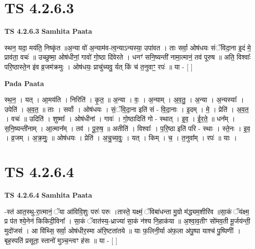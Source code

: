 \documentclass[17pt]{extarticle}
\begin{document}
\section*{ TS 4.2.6.3 }

\textbf{TS 4.2.6.3 } \newline
\textbf{Samhita Paata} \newline

स्थन॒ यदा॒ मय॑ति॒ निष्कृ॑त ॥अ॒न्या वो॑ अ॒न्याम॑व-त्व॒न्याऽन्यस्या॒ उपा॑वत । ताः सर्वा॒ ओष॑धयः संॅविदा॒ना इ॒दं मे॒ प्राव॑ता॒ वचः॑ ॥ उच्छुष्मा॒ ओष॑धीनां॒ गावो॑ गो॒ष्ठा दि॑वेरते । धनꣳ॑ सनि॒ष्यन्ती॑ नामा॒त्मानं॒ तव॑ पूरुष ॥ अति॒ विश्वाः᳚ परि॒ष्ठास्ते॒न इ॑व व्र॒जम॑क्रमुः । ओष॑धयः॒ प्राचु॑च्यवु॒ र्यत् किं च॑ त॒नुवाꣳ॒॒ रपः॑ ॥ या - [  ] \newline

\textbf{Pada Paata} \newline

स्थ॒न॒ । यत् । आ॒मय॑ति । निरिति॑ । कृ॒त॒ ॥ अ॒न्या । वः॒ । अ॒न्याम् । अ॒व॒तु॒ । अ॒न्या । अ॒न्यस्याः᳚ । उपेति॑ । अ॒व॒त॒ ॥ ताः । सर्वाः᳚ । ओष॑धयः । सं॒ॅवि॒दा॒ना इति॑ सं - वि॒दा॒नाः । इ॒दम् । मे॒ । प्रेति॑ । अ॒व॒त॒ । वचः॑ ॥ उदिति॑ । शुष्माः᳚ । ओष॑धीनां । गावः॑ । गो॒ष्ठादिति॑ गो - स्थात् । इ॒व॒ । ई॒र॒ते॒ ॥ धन᳚म् । स॒नि॒ष्यन्ती॑नाम् । आ॒त्मान᳚म् । तव॑ । पू॒रु॒ष॒ ॥ अतीति॑ । विश्वाः᳚ । प॒रि॒ष्ठा इति॑ परि - स्थाः । स्ते॒नः । इ॒व॒ । व्र॒जम् । अ॒क्र॒मुः॒ ॥ ओष॑धयः । प्रेति॑ । अ॒चु॒च्य॒वुः॒ । यत् । किम् । च॒ । त॒नुवा᳚म् । रपः॑ ॥ याः ।  \newline




\section*{ TS 4.2.6.4 }

\textbf{TS 4.2.6.4 } \newline
\textbf{Samhita Paata} \newline

-स्त॑ आत॒स्थु-रा॒त्मानं॒ ॅया आ॑विवि॒शुः परुः॑ परुः ।तास्ते॒ यक्ष्मं॒ ॅविबा॑धन्ता मु॒ग्रो म॑द्ध्यम॒शीरि॑व ॥सा॒कं ॅय॑क्ष्म॒ प्र प॑त श्ये॒नेन॑ किकिदी॒विना᳚ । सा॒कं ॅवात॑स्य॒-ध्राज्या॑ सा॒कं न॑श्य नि॒हाक॑या ॥ अ॒श्वा॒व॒तीꣳ सो॑मव॒ती मू॒र्जय॑न्ती॒ मुदो॑जसं । आ वि॑थ्सि॒ सर्वा॒ ओष॑धीर॒स्मा अ॑रि॒ष्टता॑तये ॥ याः फ॒लिनी॒र्या अ॑फ॒ला अ॑पु॒ष्पा याश्च॑ पु॒ष्पिणीः᳚ । बृह॒स्पति॑ प्रसूता॒ स्तानो॑ मुञ्च॒न्त्वꣳ ह॑सः ॥ या - [  ] \newline
\end{document}
